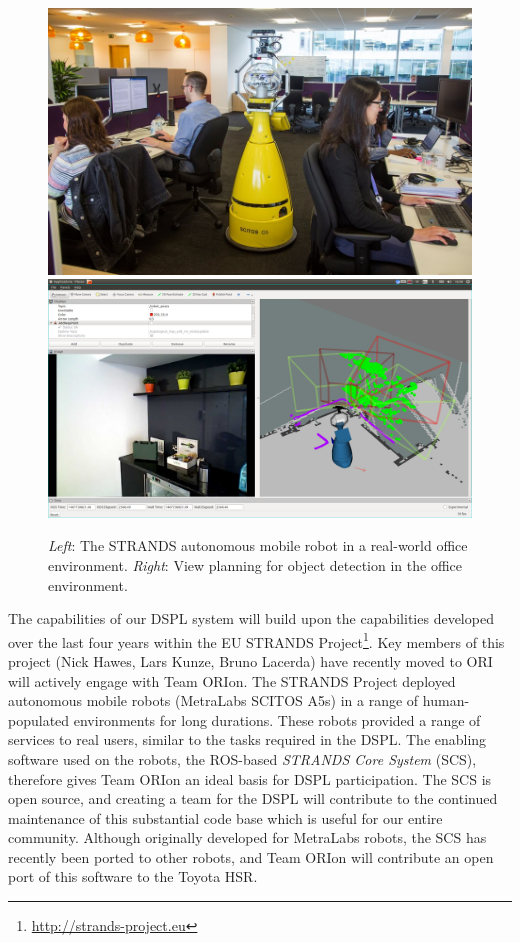 \documentclass[runningheads,a4paper]{llncs}
\newcommand{\teamori}{Team ORIon}
\begin{document}
\begin{figure}[tb]
  \begin{center}
    \includegraphics[width=.43\columnwidth]{images/betty.jpg}
    \includegraphics[width=.55\columnwidth,clip,trim=10ex 20ex 10ex 20ex]{images/viewplanning_at_tsc.png}
  \end{center}   
  \caption{\textit{Left}: The STRANDS autonomous mobile robot in a real-world
  office environment. \textit{Right}: View planning for object detection in the
  office environment.}
  \label{fig:mk}
  \vspace{-3ex}
\end{figure}

The capabilities of our DSPL system will build upon the capabilities developed over the last four years within the EU STRANDS Project\footnote{\url{http://strands-project.eu}}. Key members of this project (Nick Hawes, Lars Kunze, Bruno Lacerda) have recently moved to ORI will actively engage with \teamori. The STRANDS Project deployed autonomous mobile robots (MetraLabs SCITOS A5s) in a range of human-populated environments for long durations\cite{strands@ram}. These robots provided a range of services to real users, similar to the tasks required in the DSPL. The enabling software used on the robots, the ROS-based \emph{STRANDS Core System} (SCS), therefore gives \teamori{} an ideal basis for DSPL participation. The SCS is open source, and creating a team for the DSPL will contribute to the continued maintenance of this substantial code base which is useful for our entire community. Although originally developed for MetraLabs robots, the SCS has recently been ported to other robots, and \teamori{} will contribute an open port of this software to the Toyota HSR. 
\end{document}
